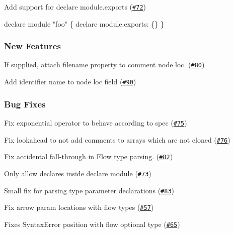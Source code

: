 \begin{DoxyItemize}
\item Add support for declare module.\+exports (\href{https://github.com/babel/babylon/pull/72}{\tt \#72}) 
\end{DoxyItemize}


\begin{DoxyCode}
declare module "foo" \{
  declare module.exports: \{\}
\}
\end{DoxyCode}


\subsubsection*{New Features}


\begin{DoxyItemize}
\item If supplied, attach filename property to comment node loc. (\href{https://github.com/babel/babylon/pull/80}{\tt \#80}) 
\item Add identifier name to node loc field (\href{https://github.com/babel/babylon/pull/90}{\tt \#90}) 
\end{DoxyItemize}

\subsubsection*{Bug Fixes}


\begin{DoxyItemize}
\item Fix exponential operator to behave according to spec (\href{https://github.com/babel/babylon/pull/75}{\tt \#75}) 
\item Fix lookahead to not add comments to arrays which are not cloned (\href{https://github.com/babel/babylon/pull/76}{\tt \#76}) 
\item Fix accidental fall-\/through in Flow type parsing. (\href{https://github.com/babel/babylon/pull/82}{\tt \#82}) 
\item Only allow declares inside declare module (\href{https://github.com/babel/babylon/pull/73}{\tt \#73}) 
\item Small fix for parsing type parameter declarations (\href{https://github.com/babel/babylon/pull/83}{\tt \#83}) 
\item Fix arrow param locations with flow types (\href{https://github.com/babel/babylon/pull/57}{\tt \#57}) 
\item Fixes Syntax\+Error position with flow optional type (\href{https://github.com/babel/babylon/pull/65}{\tt \#65}) 
\end{DoxyItemize}

